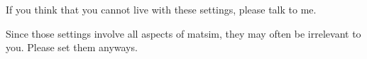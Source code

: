 If you think that you cannot live with these settings, please talk to me.

Since those settings involve all aspects of matsim, they may often be irrelevant to you. Please set them anyways.

\vfill\eject






